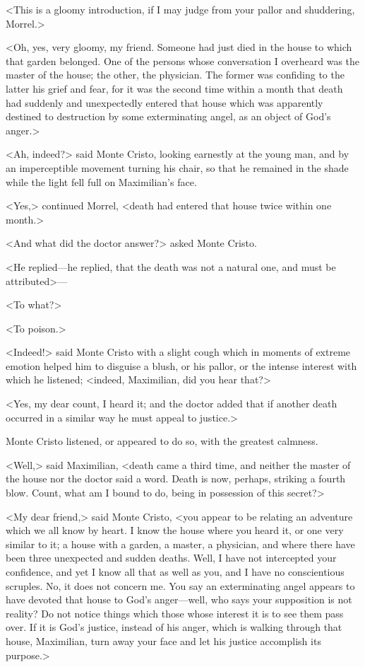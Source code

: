 <This is a gloomy introduction, if I may judge from your pallor and shuddering, Morrel.> 

 <Oh, yes, very gloomy, my friend. Someone had just died in the house to which that garden belonged. One of the persons whose conversation I overheard was the master of the house; the other, the physician. The former was confiding to the latter his grief and fear, for it was the second time within a month that death had suddenly and unexpectedly entered that house which was apparently destined to destruction by some exterminating angel, as an object of God's anger.> 

 <Ah, indeed?> said Monte Cristo, looking earnestly at the young man, and by an imperceptible movement turning his chair, so that he remained in the shade while the light fell full on Maximilian's face. 

 <Yes,> continued Morrel, <death had entered that house twice within one month.> 

 <And what did the doctor answer?> asked Monte Cristo. 

 <He replied—he replied, that the death was not a natural one, and must be attributed>— 

 <To what?> 

 <To poison.> 

 <Indeed!> said Monte Cristo with a slight cough which in moments of extreme emotion helped him to disguise a blush, or his pallor, or the intense interest with which he listened; <indeed, Maximilian, did you hear that?> 

 <Yes, my dear count, I heard it; and the doctor added that if another death occurred in a similar way he must appeal to justice.> 

 Monte Cristo listened, or appeared to do so, with the greatest calmness. 

 <Well,> said Maximilian, <death came a third time, and neither the master of the house nor the doctor said a word. Death is now, perhaps, striking a fourth blow. Count, what am I bound to do, being in possession of this secret?> 

 <My dear friend,> said Monte Cristo, <you appear to be relating an adventure which we all know by heart. I know the house where you heard it, or one very similar to it; a house with a garden, a master, a physician, and where there have been three unexpected and sudden deaths. Well, I have not intercepted your confidence, and yet I know all that as well as you, and I have no conscientious scruples. No, it does not concern me. You say an exterminating angel appears to have devoted that house to God's anger—well, who says your supposition is not reality? Do not notice things which those whose interest it is to see them pass over. If it is God's justice, instead of his anger, which is walking through that house, Maximilian, turn away your face and let his justice accomplish its purpose.> 

